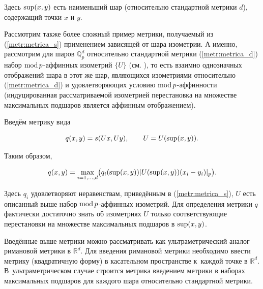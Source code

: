 Здесь ${\rm sup}(x,y)$ есть наименьший шар (относительно стандартной метрики $d$), содержащий точки $x$ и $y$.









Рассмотрим также более сложный пример метрики, получаемый из (\ref{metr:metrica_s}) применением зависящей от шара изометрии. А именно, рассмотрим для шаров $\mathbb{Q}_p^d$ относительно стандартной метрики (\ref{metr:metrica_d}) набор ${\rm mod}\, p$-аффинных изометрий $\{U\}$ (см. \cite{vectorPDO}), то есть взаимно однозначных  отображений шара в этот же шар, являющихся изометриями относительно (\ref{metr:metrica_d}) и удовлетворяющих условию ${\rm mod}\, p$-аффинности (индуцированная рассматриваемой изометрией перестановка на множестве максимальных подшаров является аффинным отображением).



Введём метрику вида

$$

q(x,y)=s(Ux,Uy),\qquad U=U({\rm sup}(x,y)).

$$

Таким образом,

$$

q(x,y)=\max_{i=1,\dots,d}\bigl(q_i({\rm sup}(x,y))|U({\rm sup}(x,y))(x_i-y_i)|_p\bigr).

$$

Здесь $q_i$ удовлетворяют неравенствам, приведённым в (\ref{metr:metrica_s}), $U$ есть описанный выше набор ${\rm mod}\, p$-аффинных изометрий. Для определения метрики $q$ фактически достаточно знать об изометриях $U$ только соответствующие перестановки на множестве максимальных подшаров в ${\rm sup}(x,y)$.





Введённые выше метрики можно рассматривать как ультраметрический аналог римановой метрики в $\mathbb{R}^d$. Для введения римановой метрики необходимо ввести метрику (квадратичную форму) в касательном пространстве к~каждой точке в $\mathbb{R}^d$. В~ультраметрическом случае строится метрика введением метрики в наборах максимальных подшаров для каждого шара относительно стандартной метрики.







\smallskip




